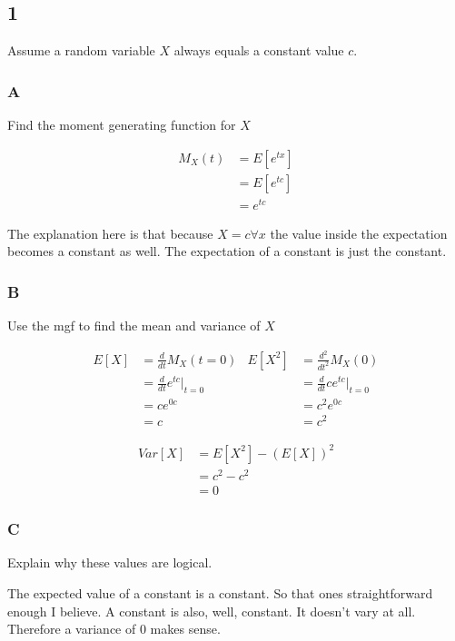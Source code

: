 \subsection*{1}

Assume a random variable $X$ always equals a constant value $c$.

\subsubsection*{A}

Find the moment generating function for $X$

\begin{align*}
	M_X(t) &= E[e^{tx}] \\
	&= E[e^{tc}] \\
	&= e^{tc}
\end{align*}

The explanation here is that because $X=c \forall x$ the value inside the expectation becomes a constant as well. The expectation of a constant is just the constant. 

\subsubsection*{B}

Use the mgf to find the mean and variance of $X$

\begin{align*}
	E[X] &= \frac{d}{dt} M_X(t=0) & E[X^2] &= \frac{d^2}{dt^2} M_X(0) \\
	&= \frac{d}{dt} e^{tc} \bigg\rvert_{t=0} & &= \frac{d}{dt} ce^{tc} \bigg\rvert_{t=0} \\
	&= ce^{0c} & &= c^2 e^{0c} \\
	&= c & &= c^2
\end{align*}

\begin{align*}
	Var[X] &= E[X^2] - (E[X])^2 \\
	&= c^2 - c^2 \\
	&= 0
\end{align*}

\subsubsection*{C}

Explain why these values are logical.

The expected value of a constant is a constant. So that ones straightforward enough I believe. A constant is also, well, constant. It doesn't vary at all. Therefore a variance of 0 makes sense.

